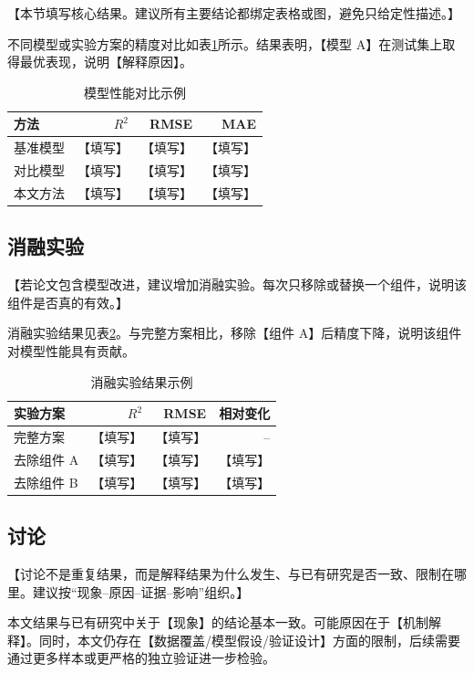 【本节填写核心结果。建议所有主要结论都绑定表格或图，避免只给定性描述。】

不同模型或实验方案的精度对比如表\ref{tab:model-performance}所示。结果表明，【模型 A】在测试集上取得最优表现，说明【解释原因】。

\begin{table}[ht]
  \centering
  \caption{模型性能对比示例}
  \label{tab:model-performance}
  \begin{tabular}{lrrr}
    \toprule
    方法 & $R^2$ & RMSE & MAE \\
    \midrule
    基准模型 & 【填写】 & 【填写】 & 【填写】 \\
    对比模型 & 【填写】 & 【填写】 & 【填写】 \\
    本文方法 & 【填写】 & 【填写】 & 【填写】 \\
    \bottomrule
  \end{tabular}
\end{table}

\subsection{消融实验}

【若论文包含模型改进，建议增加消融实验。每次只移除或替换一个组件，说明该组件是否真的有效。】

消融实验结果见表\ref{tab:ablation}。与完整方案相比，移除【组件 A】后精度下降，说明该组件对模型性能具有贡献。

\begin{table}[ht]
  \centering
  \caption{消融实验结果示例}
  \label{tab:ablation}
  \begin{tabular}{lrrr}
    \toprule
    实验方案 & $R^2$ & RMSE & 相对变化 \\
    \midrule
    完整方案 & 【填写】 & 【填写】 & -- \\
    去除组件 A & 【填写】 & 【填写】 & 【填写】 \\
    去除组件 B & 【填写】 & 【填写】 & 【填写】 \\
    \bottomrule
  \end{tabular}
\end{table}

\subsection{讨论}

【讨论不是重复结果，而是解释结果为什么发生、与已有研究是否一致、限制在哪里。建议按“现象--原因--证据--影响”组织。】

本文结果与已有研究中关于【现象】的结论基本一致\citep{meyer2021predicting}。可能原因在于【机制解释】。同时，本文仍存在【数据覆盖/模型假设/验证设计】方面的限制，后续需要通过更多样本或更严格的独立验证进一步检验。
